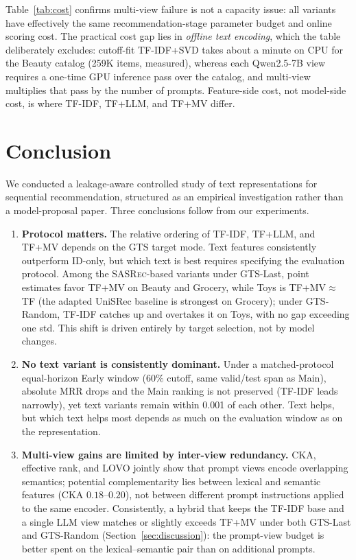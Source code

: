 \documentclass[sigconf,natbib=true,anonymous]{acmart}
\newcommand{\tfidf}{\textsc{TF-IDF}\xspace}
\newcommand{\tfllm}{\textsc{TF+LLM}\xspace}
\newcommand{\tfmv}{\textsc{TF+MV}\xspace}
\newcommand{\base}{\textsc{SASRec}\xspace}
\begin{document}
Table~\ref{tab:cost} confirms multi-view failure is not a capacity issue: all variants have effectively the same recommendation-stage parameter budget and online scoring cost.
The practical cost gap lies in \emph{offline text encoding}, which the table deliberately excludes: cutoff-fit \tfidf+SVD takes about a minute on CPU for the Beauty catalog (259K items, measured), whereas each Qwen2.5-7B view requires a one-time GPU inference pass over the catalog, and multi-view multiplies that pass by the number of prompts.
Feature-side cost, not model-side cost, is where \tfidf, \tfllm, and \tfmv differ.

\section{Conclusion}
\label{sec:conclusion}

We conducted a leakage-aware controlled study of text representations for sequential recommendation, structured as an empirical investigation rather than a model-proposal paper.
Three conclusions follow from our experiments.

\begin{enumerate}[leftmargin=*,itemsep=1pt]
\item \textbf{Protocol matters.}
The relative ordering of \tfidf, \tfllm, and \tfmv depends on the GTS target mode.
Text features consistently outperform ID-only, but which text is best requires specifying the evaluation protocol.
Among the \base-based variants under GTS-Last, point estimates favor \tfmv on Beauty and Grocery, while Toys is TF+MV${}\approx{}$TF (the adapted UniSRec baseline is strongest on Grocery); under GTS-Random, \tfidf catches up and overtakes it on Toys, with no gap exceeding one std. This shift is driven entirely by target selection, not by model changes.
\item \textbf{No text variant is consistently dominant.}
Under a matched-protocol equal-horizon Early window ($60\%$ cutoff, same valid/\hspace{0pt}test span as Main), absolute MRR drops and the Main ranking is not preserved (\tfidf leads narrowly), yet text variants remain within 0.001 of each other.
Text helps, but which text helps most depends as much on the evaluation window as on the representation.
\item \textbf{Multi-view gains are limited by inter-view redundancy.}
CKA, effective rank, and LOVO jointly show that prompt views encode overlapping semantics; potential complementarity lies between lexical and semantic features (CKA $0.18$--$0.20$), not between different prompt instructions applied to the same encoder.
Consistently, a hybrid that keeps the \tfidf base and a single LLM view matches or slightly exceeds \tfmv under both GTS-Last and GTS-Random (Section~\ref{sec:discussion}): the prompt-view budget is better spent on the lexical--semantic pair than on additional prompts.
\end{enumerate}
\end{document}
